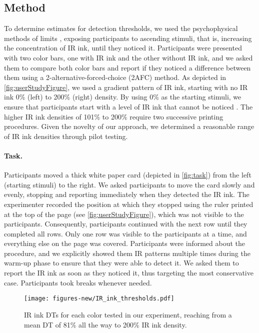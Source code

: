 \subsection{Method}
To determine estimates for detection thresholds, we used the psychophysical methods of limits \cite{kingdom_chapter_2016}, exposing participants to ascending stimuli, that is, increasing the concentration of IR ink, until they noticed it. Participants were presented with two color bars, one with IR ink and the other without IR ink, and we asked them to compare both color bars and report if they noticed a difference between them using a 2-alternative-forced-choice (2AFC) method. As depicted in \autoref{fig:userStudyFigure}, we used a gradient pattern of IR ink, starting with no IR ink 0\% (left) to 200\% (right) density. By using 0\% as the starting stimuli, we ensure that participants start with a level of IR ink that cannot be noticed \cite{leek_adaptive_2001}. The higher IR ink densities of 101\% to 200\% require two successive printing procedures. Given the novelty of our approach, we determined a reasonable range of IR ink densities through pilot testing. 

\paragraph{Task.} Participants moved a thick white paper card (depicted in \autoref{fig:task}) from the left (starting stimuli) to the right. We asked participants to move the card slowly and evenly, stopping and reporting immediately when they detected the IR ink. The experimenter recorded the position at which they stopped using the ruler printed at the top of the page (see \autoref{fig:userStudyFigure}), which was not visible to the participants. Consequently, participants continued with the next row until they completed all rows. Only one row was visible to the participants at a time, and everything else on the page was covered. Participants were informed about the procedure, and we explicitly showed them IR patterns multiple times during the warm-up phase to ensure that they were able to detect it. We asked them to report the IR ink as soon as they noticed it, thus targeting the most conservative case. Participants took breaks whenever needed. 


\begin{figure*}[h]
  \centering
  \texttt{[image: figures-new/IR\_ink\_thresholds.pdf]}
  \caption{IR ink DTs for each color tested in our experiment, reaching from a mean DT of 81\% all the way to 200\% IR ink density. }
  \label{fig:thresholds}
\end{figure*}




